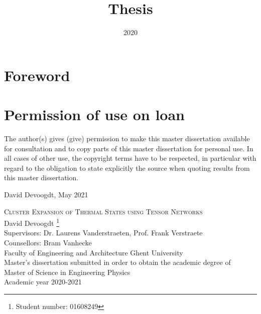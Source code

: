 \documentclass{book}
\title{Thesis}
\date{2020}
\newcounter{a}
\newcounter{b}
\begin{document}



\frontmatter



\newpage
\thispagestyle{empty}
\mbox{}
\newpage



\newpage
\listoftodos
\newpage


\section*{Foreword}

\newpage
\section*{Permission of use on loan}
The author(s) gives (give) permission to make this master dissertation available for consultation and to copy parts of this master dissertation for personal use. In all cases of other use, the copyright terms have to be respected, in particular with regard to the obligation to state explicitly the source when quoting results from this master dissertation.

David Devoogdt, May 2021

\newpage



%

\begin{center}

    \Large{\textsc{Cluster Expansion of Thermal States using Tensor
            Networks}} \\  [0.2cm]

    David Devoogdt \footnote{Student number: 01608249 }\\ [0.3cm]

    \normalsize{Supervisors: Dr. Laurens Vanderstraeten, Prof. Frank Verstraete} \\
    \normalsize{Counsellors: Bram Vanhecke} \\ [0.2cm]
    Faculty of Engineering and Architecture Ghent University\\[0.2cm]
    \small{Master's dissertation submitted in order to obtain the academic degree of \\
        Master of Science in Engineering Physics} \\ [0.2cm]
    \normalsize{Academic year 2020-2021} \\  %

\end{center}
\end{document}
